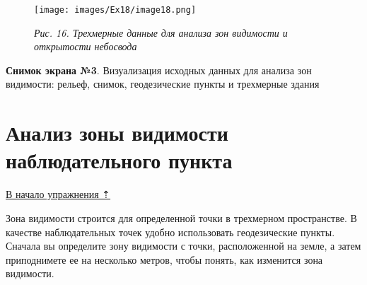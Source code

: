 \documentclass[12pt,]{book}
\begin{document}
\begin{enumerate}
  \begin{figure}
  \centering
  \texttt{[image: images/Ex18/image18.png]}
  \caption{\emph{Рис. 16. Трехмерные данные для анализа зон видимости и открытости небосвода}}
  \end{figure}

  \textbf{Снимок экрана №3}. Визуализация исходных данных для анализа зон видимости: рельеф, снимок, геодезические пункты и трехмерные здания
\end{enumerate}

\hypertarget{threed-modelling-viewshed}{%
\section{Анализ зоны видимости наблюдательного пункта}\label{threed-modelling-viewshed}}

\protect\hyperlink{threed-modelling}{В начало упражнения ⇡}

Зона видимости строится для определенной точки в трехмерном пространстве. В качестве наблюдательных точек удобно использовать геодезические пункты. Сначала вы определите зону видимости с точки, расположенной на земле, а затем приподнимете ее на несколько метров, чтобы понять, как изменится зона видимости.
\end{document}
